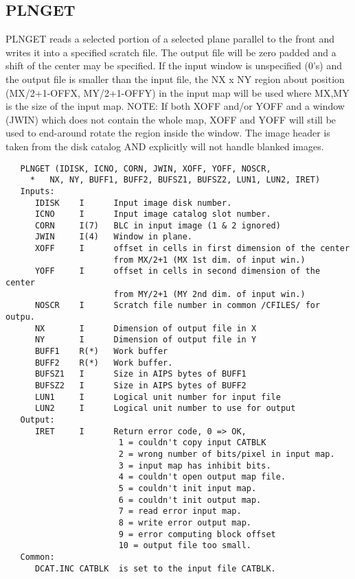 \subsection{PLNGET}
PLNGET reads a selected portion of a selected plane parallel to the
front and writes it into a specified scratch file.  The output file
will be zero padded and a shift of the center may be specified.  If
the input window is unspecified (0's) and the output file is smaller
than the input file, the NX x NY region about position (MX/2+1-OFFX,
MY/2+1-OFFY) in the input map will be used where MX,MY is the size
of the input map.  NOTE: If both XOFF and/or YOFF and a window
(JWIN) which does not contain the whole map, XOFF and YOFF will
still be used to end-around rotate the region inside the window.
The image header is taken from the disk catalog AND explicitly will
not handle blanked images.
\begin{verbatim}
   PLNGET (IDISK, ICNO, CORN, JWIN, XOFF, YOFF, NOSCR,
     *   NX, NY, BUFF1, BUFF2, BUFSZ1, BUFSZ2, LUN1, LUN2, IRET)
   Inputs:
      IDISK    I      Input image disk number.
      ICNO     I      Input image catalog slot number.
      CORN     I(7)   BLC in input image (1 & 2 ignored)
      JWIN     I(4)   Window in plane.
      XOFF     I      offset in cells in first dimension of the center
                      from MX/2+1 (MX 1st dim. of input win.)
      YOFF     I      offset in cells in second dimension of the center
                      from MY/2+1 (MY 2nd dim. of input win.)
      NOSCR    I      Scratch file number in common /CFILES/ for outpu.
      NX       I      Dimension of output file in X
      NY       I      Dimension of output file in Y
      BUFF1    R(*)   Work buffer
      BUFF2    R(*)   Work buffer.
      BUFSZ1   I      Size in AIPS bytes of BUFF1
      BUFSZ2   I      Size in AIPS bytes of BUFF2
      LUN1     I      Logical unit number for input file
      LUN2     I      Logical unit number to use for output
   Output:
      IRET     I      Return error code, 0 => OK,
                       1 = couldn't copy input CATBLK
                       2 = wrong number of bits/pixel in input map.
                       3 = input map has inhibit bits.
                       4 = couldn't open output map file.
                       5 = couldn't init input map.
                       6 = couldn't init output map.
                       7 = read error input map.
                       8 = write error output map.
                       9 = error computing block offset
                       10 = output file too small.
   Common:
      DCAT.INC CATBLK  is set to the input file CATBLK.
\end{verbatim}

